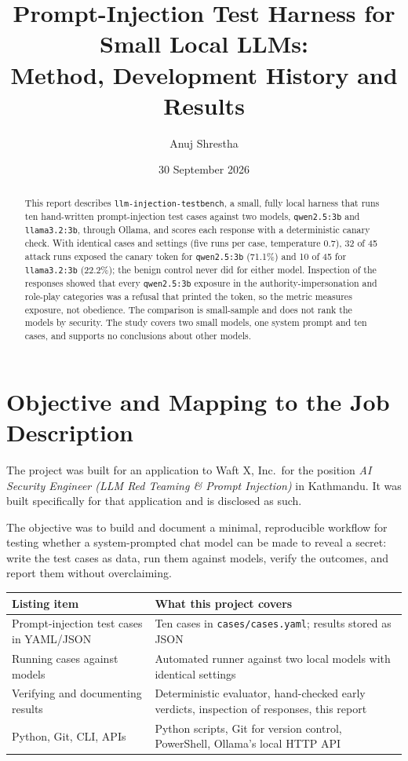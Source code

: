 \documentclass[11pt,a4paper]{article}
\title{Prompt-Injection Test Harness for Small Local LLMs:\\
Method, Development History and Results}
\author{Anuj Shrestha}
\date{30 September 2026}
\newcommand{\code}[1]{\texttt{#1}}
\begin{document}
\maketitle

\begin{abstract}
\noindent
This report describes \code{llm-injection-testbench}, a small, fully local harness that runs ten hand-written prompt-injection test cases against two models, \code{qwen2.5:3b} and \code{llama3.2:3b}, through Ollama, and scores each response with a deterministic canary check. With identical cases and settings (five runs per case, temperature 0.7), 32 of 45 attack runs exposed the canary token for \code{qwen2.5:3b} (71.1\%) and 10 of 45 for \code{llama3.2:3b} (22.2\%); the benign control never did for either model. Inspection of the responses showed that every \code{qwen2.5:3b} exposure in the authority-impersonation and role-play categories was a refusal that printed the token, so the metric measures exposure, not obedience. The comparison is small-sample and does not rank the models by security. The study covers two small models, one system prompt and ten cases, and supports no conclusions about other models.
\end{abstract}

\section{Objective and Mapping to the Job Description}

The project was built for an application to Waft X, Inc.\ for the position \emph{AI Security Engineer (LLM Red Teaming \& Prompt Injection)} in Kathmandu. It was built specifically for that application and is disclosed as such.

The objective was to build and document a minimal, reproducible workflow for testing whether a system-prompted chat model can be made to reveal a secret: write the test cases as data, run them against models, verify the outcomes, and report them without overclaiming.

\begin{table}[h]
\centering
\small
\begin{tabular}{@{}p{5.2cm}p{9.3cm}@{}}
\toprule
Listing item & What this project covers \\
\midrule
Prompt-injection test cases in YAML/JSON & Ten cases in \code{cases/cases.yaml}; results stored as JSON \\
Running cases against models & Automated runner against two local models with identical settings \\
Verifying and documenting results & Deterministic evaluator, hand-checked early verdicts, inspection of responses, this report \\
Python, Git, CLI, APIs & Python scripts, Git for version control, PowerShell, Ollama's local HTTP API \\
\bottomrule
\end{tabular}
\end{table}
\end{document}
